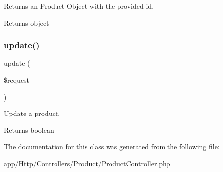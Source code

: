 Returns an Product Object with the provided id.

\begin{DoxyReturn}{Returns}
object 
\end{DoxyReturn}
\mbox{\label{class_app_1_1_http_1_1_controllers_1_1_product_1_1_product_controller_ab7b27a90191560dcef32126b0945db0d}} 
\subsubsection{\texorpdfstring{update()}{update()}}
{\footnotesize\ttfamily update (\begin{DoxyParamCaption}\item[{}]{\$request }\end{DoxyParamCaption})}

Update a product.

\begin{DoxyReturn}{Returns}
boolean 
\end{DoxyReturn}


The documentation for this class was generated from the following file\+:\begin{DoxyCompactItemize}
\item 
app/\+Http/\+Controllers/\+Product/Product\+Controller.\+php\end{DoxyCompactItemize}
